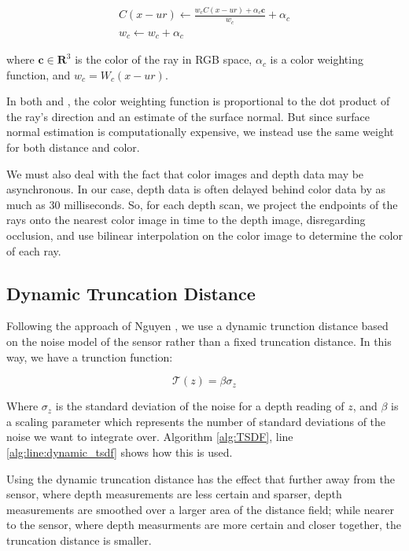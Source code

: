 \documentclass[10pt,twocolumn,letterpaper]{article}
\begin{document}
\begin{align}
C(x - ur) \gets \frac{w_c C(x - ur) + \alpha_c \mathbf{c}}{w_c}
+\alpha_c
\\
%
w_c \gets w_c + \alpha_c
\end{align}

\noindent where $\mathbf{c} \in \mathbf{R}^3$ is the color of the ray in RGB
space, $\alpha_c$ is a color weighting function, and $w_c = W_c(x -
ur)$.

In both \cite{Bylow2013} and \cite{Whelan2013}, the color weighting function is
proportional to the dot product of the ray's direction and an estimate of the
surface normal. But since surface normal estimation is computationally
expensive, we instead use the same weight for both distance and color.

We must also deal with the fact that color images and depth data may be
asynchronous. In our case, depth data is often delayed behind color data by as
much as 30 milliseconds. So, for each depth scan, we project the endpoints of
the rays onto the nearest color image in time to the depth image, disregarding
occlusion, and use bilinear interpolation on the color image to determine the
color of each ray.

\subsection{Dynamic Truncation Distance}
Following the approach of Nguyen \etal\cite{Nguyen2012}, we use a dynamic
trunction distance based on the noise model of the sensor rather than a fixed
truncation distance. In this way, we have a trunction function:

\begin{equation} \mathcal{T} (z) = \beta\sigma_{z} \end{equation}

Where $\sigma_{z}$ is the standard deviation of the noise for a depth reading
of $z$, and $\beta$ is a scaling parameter which represents the number of
standard deviations of the noise we want to integrate over. Algorithm
\ref{alg:TSDF}, line \ref{alg:line:dynamic_tsdf} shows how this is used.

Using the dynamic truncation distance has the effect that further away from the
sensor, where depth measurements are less certain and sparser, depth
measurements are smoothed over a larger area of the distance field; while nearer
to the sensor, where depth measurments are more certain and closer together, the
truncation distance is smaller.
\end{document}
